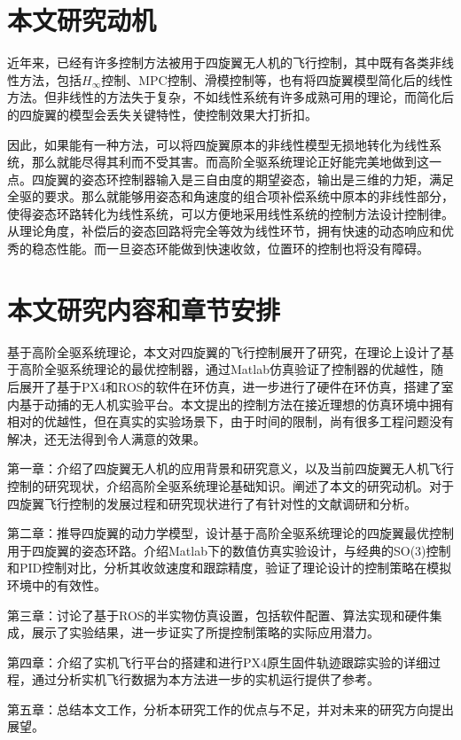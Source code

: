 \section{本文研究动机}
近年来，已经有许多控制方法被用于四旋翼无人机的飞行控制，其中既有各类非线性方法，包括$H_\infty$控制\cite{H}、MPC控制\cite{MPC}、滑模控制\cite{sliding}等，也有将四旋翼模型简化后的线性方法\cite{boua2007}。但非线性的方法失于复杂，不如线性系统有许多成熟可用的理论，而简化后的四旋翼的模型会丢失关键特性，使控制效果大打折扣。

因此，如果能有一种方法，可以将四旋翼原本的非线性模型无损地转化为线性系统，那么就能尽得其利而不受其害。而高阶全驱系统理论正好能完美地做到这一点。四旋翼的姿态环控制器输入是三自由度的期望姿态，输出是三维的力矩，满足全驱的要求。那么就能够用姿态和角速度的组合项补偿系统中原本的非线性部分，使得姿态环路转化为线性系统，可以方便地采用线性系统的控制方法设计控制律。从理论角度，补偿后的姿态回路将完全等效为线性环节，拥有快速的动态响应和优秀的稳态性能。而一旦姿态环能做到快速收敛，位置环的控制也将没有障碍。
\section{本文研究内容和章节安排}
基于高阶全驱系统理论，本文对四旋翼的飞行控制展开了研究，在理论上设计了基于高阶全驱系统理论的最优控制器，通过Matlab仿真验证了控制器的优越性，随后展开了基于PX4和ROS的软件在环仿真，进一步进行了硬件在环仿真，搭建了室内基于动捕的无人机实验平台。本文提出的控制方法在接近理想的仿真环境中拥有相对的优越性，但在真实的实验场景下，由于时间的限制，尚有很多工程问题没有解决，还无法得到令人满意的效果。

第一章：介绍了四旋翼无人机的应用背景和研究意义，以及当前四旋翼无人机飞行控制的研究现状，介绍高阶全驱系统理论基础知识。阐述了本文的研究动机。对于四旋翼飞行控制的发展过程和研究现状进行了有针对性的文献调研和分析。

第二章：推导四旋翼的动力学模型，设计基于高阶全驱系统理论的四旋翼最优控制用于四旋翼的姿态环路。介绍Matlab下的数值仿真实验设计，与经典的SO(3)控制和PID控制对比，分析其收敛速度和跟踪精度，验证了理论设计的控制策略在模拟环境中的有效性。

第三章：讨论了基于ROS的半实物仿真设置，包括软件配置、算法实现和硬件集成，展示了实验结果，进一步证实了所提控制策略的实际应用潜力。

第四章：介绍了实机飞行平台的搭建和进行PX4原生固件轨迹跟踪实验的详细过程，通过分析实机飞行数据为本方法进一步的实机运行提供了参考。

第五章：总结本文工作，分析本研究工作的优点与不足，并对未来的研究方向提出展望。